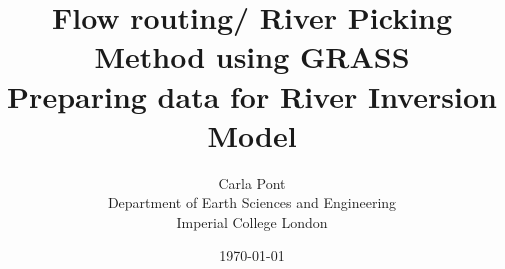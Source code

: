 \title{Flow routing/ River Picking Method using GRASS\\
\vspace*{3mm} Preparing data for River Inversion Model
\vspace*{6mm}}
\author{Carla Pont\\
	Department of Earth Sciences and Engineering\\
	Imperial College London}
\date{\today}